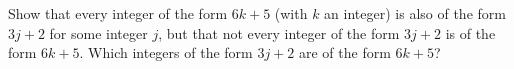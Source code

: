 Show that every integer of the form $6k+5$ (with $k$ an integer) is also of the form $3j+2$ for some integer $j$, but that not every integer of the form $3j+2$ is of the form $6k+5$. Which integers of the form $3j+2$ are of the form $6k+5$?
